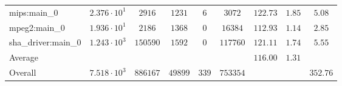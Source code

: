 \begin{tabular}{|l|c|c|c|c|c|c|c|c|}
mips:main\_0            & $ 2.376 \cdot 10^{1} $ & $ 2916   $ & $ 1231  $ & $ 6   $ & $ 3072   $ & $ 122.73      $ & $ 1.85    $ & $ 5.08    $ \\
mpeg2:main\_0           & $ 1.936 \cdot 10^{1} $ & $ 2186   $ & $ 1368  $ & $ 0   $ & $ 16384  $ & $ 112.93      $ & $ 1.14    $ & $ 2.85    $ \\
sha\_driver:main\_0     & $ 1.243 \cdot 10^{3} $ & $ 150590 $ & $ 1592  $ & $ 0   $ & $ 117760 $ & $ 121.11      $ & $ 1.74    $ & $ 5.55    $ \\
\hline
Average                 & $                    $ & $        $ & $       $ & $     $ & $        $ & $ 116.00      $ & $ 1.31    $ & $         $ \\
\hline
Overall                 & $ 7.518 \cdot 10^{3} $ & $ 886167 $ & $ 49899 $ & $ 339 $ & $ 753354 $ & $             $ & $         $ & $ 352.76  $ \\
\hline
\end{tabular}
